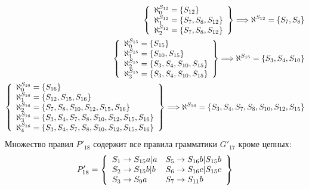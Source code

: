 \begin{itemize}
\begin{align*}
		      \left\{ \begin{array}{l} 
		      \aleph^{S_{12}}_{0}  = \left\{S_{12}\right\}                                             \\
		      \aleph^{S_{12}}_{1}  = \left\{S_7, S_8, S_{12}\right\}                                   \\
		      \aleph^{S_{12}}_{2}  = \left\{S_7, S_8, S_{12}\right\}                                   \\
		       \end{array} \right\}\Longrightarrow {\aleph^{S_{12}}  =  \left\{S_7, S_8\right\} }                                            \\
		      \left\{ \begin{array}{l} 
		      \aleph^{S_{15}}_{0}  = \left\{S_{15}\right\}                                             \\
		      \aleph^{S_{15}}_{1}  = \left\{S_{10}, S_{15}\right\}                                     \\
		      \aleph^{S_{15}}_{2}  = \left\{S_3, S_4, S_{10}, S_{15}\right\}                           \\
		      \aleph^{S_{15}}_{3}  = \left\{S_3, S_4, S_{10}, S_{15}\right\}                           \\
		       \end{array} \right\}\Longrightarrow {\aleph^{S_{15}}  =  \left\{S_3, S_4, S_{10}\right\} }                                    \\
		      \left\{ \begin{array}{l} 
		      \aleph^{S_{16}}_{0}  = \left\{S_{16}\right\}                                             \\
		      \aleph^{S_{16}}_{1}  = \left\{S_{12}, S_{15}, S_{16}\right\}                             \\
		      \aleph^{S_{16}}_{2}  = \left\{S_7, S_8, S_{10}, S_{12}, S_{15}, S_{16}\right\}           \\
		      \aleph^{S_{16}}_{3}  = \left\{S_3, S_4, S_7, S_8, S_{10}, S_{12}, S_{15}, S_{16}\right\} \\
		      \aleph^{S_{16}}_{4}  = \left\{S_3, S_4, S_7, S_8, S_{10}, S_{12}, S_{15}, S_{16}\right\} \\
		       \end{array} \right\}\Longrightarrow {\aleph^{S_{16}}  =  \left\{S_3, S_4, S_7, S_8, S_{10}, S_{12}, S_{15}\right\} }          \\
	      \end{align*}
	      Множество правил \(P'_{18}\) содержит все правила грамматики \(G'_{17}\) кроме цепных:
	      \begin{align*}
		      P'_{18} = \left\{
			      \begin{array}{ll}
				      S_1 \to S_{15}a|a & S_5 \to S_{16}b|S_{15}b \\
				      S_2 \to S_{15}b|b & S_6 \to S_{16}c|S_{15}c \\
				      S_3 \to S_9a      & S_7 \to S_{11}b         \\

\end{array}\right\}
\end{align*}
\end{itemize}
